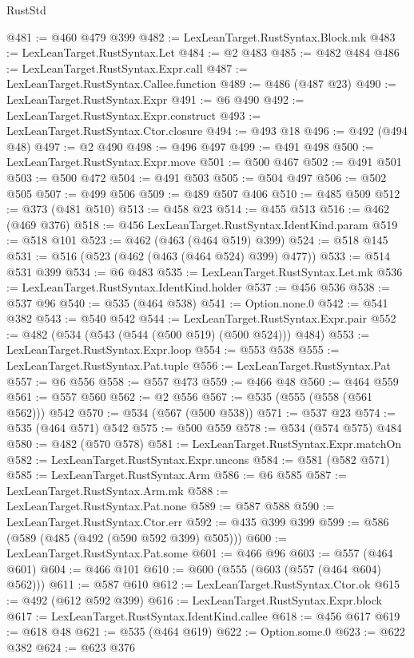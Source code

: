 \begin{lexlean}{RustStd}
\begin{coremodule}
@481 := @460 @479 @399
@482 := LexLeanTarget.RustSyntax.Block.mk
@483 := LexLeanTarget.RustSyntax.Let
@484 := @2 @483
@485 := @482 @484
@486 := LexLeanTarget.RustSyntax.Expr.call
@487 := LexLeanTarget.RustSyntax.Callee.function
@489 := @486 (@487 @23)
@490 := LexLeanTarget.RustSyntax.Expr
@491 := @6 @490
@492 := LexLeanTarget.RustSyntax.Expr.construct
@493 := LexLeanTarget.RustSyntax.Ctor.closure
@494 := @493 @18
@496 := @492 (@494 @48)
@497 := @2 @490
@498 := @496 @497
@499 := @491 @498
@500 := LexLeanTarget.RustSyntax.Expr.move
@501 := @500 @467
@502 := @491 @501
@503 := @500 @472
@504 := @491 @503
@505 := @504 @497
@506 := @502 @505
@507 := @499 @506
@509 := @489 @507 @406
@510 := @485 @509
@512 := @373 (@481 @510)
@513 := @458 @23
@514 := @455 @513
@516 := @462 (@469 @376)
@518 := @456 LexLeanTarget.RustSyntax.IdentKind.param
@519 := @518 @101
@523 := @462 (@463 (@464 @519) @399)
@524 := @518 @145
@531 := @516 (@523 (@462 (@463 (@464 @524) @399) @477))
@533 := @514 @531 @399
@534 := @6 @483
@535 := LexLeanTarget.RustSyntax.Let.mk
@536 := LexLeanTarget.RustSyntax.IdentKind.holder
@537 := @456 @536
@538 := @537 @96
@540 := @535 (@464 @538)
@541 := Option.none.{0}
@542 := @541 @382
@543 := @540 @542
@544 := LexLeanTarget.RustSyntax.Expr.pair
@552 := @482 (@534 (@543 (@544 (@500 @519) (@500 @524))) @484)
@553 := LexLeanTarget.RustSyntax.Expr.loop
@554 := @553 @538
@555 := LexLeanTarget.RustSyntax.Pat.tuple
@556 := LexLeanTarget.RustSyntax.Pat
@557 := @6 @556
@558 := @557 @473
@559 := @466 @48
@560 := @464 @559
@561 := @557 @560
@562 := @2 @556
@567 := @535 (@555 (@558 (@561 @562))) @542
@570 := @534 (@567 (@500 @538))
@571 := @537 @23
@574 := @535 (@464 @571) @542
@575 := @500 @559
@578 := @534 (@574 @575) @484
@580 := @482 (@570 @578)
@581 := LexLeanTarget.RustSyntax.Expr.matchOn
@582 := LexLeanTarget.RustSyntax.Expr.uncons
@584 := @581 (@582 @571)
@585 := LexLeanTarget.RustSyntax.Arm
@586 := @6 @585
@587 := LexLeanTarget.RustSyntax.Arm.mk
@588 := LexLeanTarget.RustSyntax.Pat.none
@589 := @587 @588
@590 := LexLeanTarget.RustSyntax.Ctor.err
@592 := @435 @399 @399
@599 := @586 (@589 (@485 (@492 (@590 @592 @399) @505)))
@600 := LexLeanTarget.RustSyntax.Pat.some
@601 := @466 @96
@603 := @557 (@464 @601)
@604 := @466 @101
@610 := @600 (@555 (@603 (@557 (@464 @604) @562)))
@611 := @587 @610
@612 := LexLeanTarget.RustSyntax.Ctor.ok
@615 := @492 (@612 @592 @399)
@616 := LexLeanTarget.RustSyntax.Expr.block
@617 := LexLeanTarget.RustSyntax.IdentKind.callee
@618 := @456 @617
@619 := @618 @48
@621 := @535 (@464 @619)
@622 := Option.some.{0}
@623 := @622 @382
@624 := @623 @376

\end{coremodule}
\end{lexlean}
